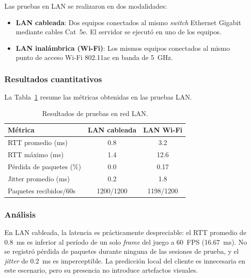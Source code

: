 \documentclass[conference]{IEEEtran}
\begin{document}
Las pruebas en LAN se realizaron en dos modalidades:

\begin{itemize}
    \item \textbf{LAN cableada}: Dos equipos conectados al mismo \textit{switch} Ethernet Gigabit mediante cables Cat~5e. El servidor se ejecut\'o en uno de los equipos.
    \item \textbf{LAN inal\'ambrica (Wi-Fi)}: Los mismos equipos conectados al mismo punto de acceso Wi-Fi 802.11ac en banda de 5~GHz.
\end{itemize}

\subsubsection{Resultados cuantitativos}

La Tabla~\ref{tab:lan_results} resume las m\'etricas obtenidas en las pruebas LAN.

\begin{table}[!h]
\centering
\caption{Resultados de pruebas en red LAN.}
\label{tab:lan_results}
\begin{tabular}{@{}lcc@{}}
\toprule
\textbf{M\'etrica} & \textbf{LAN cableada} & \textbf{LAN Wi-Fi} \\
\midrule
RTT promedio (ms)          & 0.8      & 3.2      \\
RTT m\'aximo (ms)          & 1.4      & 12.6     \\
P\'erdida de paquetes (\%) & 0.0      & 0.17     \\
Jitter promedio (ms)       & 0.2      & 1.8      \\
Paquetes recibidos/60s     & 1200/1200 & 1198/1200 \\
\bottomrule
\end{tabular}
\end{table}

\subsubsection{An\'alisis}

En LAN cableada, la latencia es pr\'acticamente despreciable: el RTT promedio de 0.8~ms es inferior al per\'iodo de un solo \textit{frame} del juego a 60~FPS (16.67~ms). No se registr\'o p\'erdida de paquetes durante ninguna de las sesiones de prueba, y el \textit{jitter} de 0.2~ms es imperceptible. La predicci\'on local del cliente es innecesaria en este escenario, pero su presencia no introduce artefactos visuales.
\end{document}

